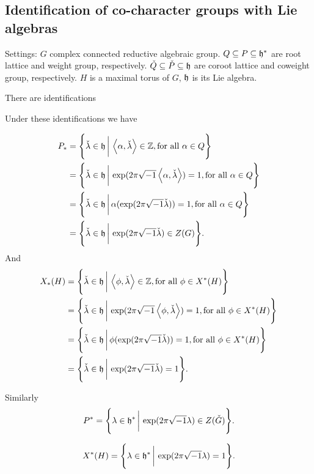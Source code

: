 
\label{1}

\subsection{Identification of co-character groups with Lie algebras}
Settings: $G$ complex connected reductive algebraic group. $Q \subseteq P \subseteq \mathfrak{h}^*$ are root lattice and weight group, respectively. $\check{Q} \subseteq \check{P} \subseteq \mathfrak{h}$ are coroot lattice and coweight group, respectively. $H$ is a maximal torus of $G$, $\mathfrak{h}$ is its Lie algebra.


There are identifications 




Under these identifications we have

\begin{align*}
  P_* &= \Biggl\{\check{\lambda} \in \mathfrak{h}\,\bigg\lvert\,\left\langle\alpha,\check{\lambda}\right\rangle \in \mathbb{Z}, \textrm{for all $\alpha \in Q$}\Biggr\}\\
  & = \Biggl\{\check{\lambda} \in \mathfrak{h}\,\bigg\lvert\,\exp(2\pi\sqrt{-1}\left\langle\alpha,\check{\lambda}\right\rangle) = 1, \textrm{for all $\alpha \in Q$}\Biggr\}\\
  & = \Biggl\{\check{\lambda} \in \mathfrak{h}\,\bigg\lvert\,\alpha(\exp(2\pi\sqrt{-1}\check{\lambda})) = 1, \textrm{for all $\alpha \in Q$}\Biggr\}\\
  & = \Biggl\{\check{\lambda} \in \mathfrak{h}\,\bigg\lvert\,\exp(2\pi\sqrt{-1}\check{\lambda}) \in Z(G)\Biggr\}.
\end{align*}
And
\begin{align*}
  X_{*}(H) & = \Biggl\{\check{\lambda} \in \mathfrak{h}\,\bigg\lvert\,\left\langle\phi,\check{\lambda}\right\rangle \in \mathbb{Z}, \textrm{for all $\phi \in X^*(H)$}\Biggr\}\\
  & = \Biggl\{\check{\lambda} \in \mathfrak{h}\,\bigg\lvert\,\exp(2\pi\sqrt{-1}\left\langle\phi,\check{\lambda}\right\rangle) = 1, \textrm{for all $\phi \in X^*(H)$}\Biggr\}\\
  & = \Biggl\{\check{\lambda} \in \mathfrak{h}\,\bigg\lvert\,\phi(\exp(2\pi\sqrt{-1}\check{\lambda})) = 1, \textrm{for all $\phi \in X^*(H)$}\Biggr\}\\
  & = \Biggl\{\check{\lambda} \in \mathfrak{h}\,\bigg\lvert\,\exp(2\pi\sqrt{-1}\check{\lambda}) = 1\Biggr\}.
\end{align*} 

Similarly
\[P^* = \Biggl\{\lambda \in \mathfrak{h}^*\,\bigg\lvert\,\exp(2 \pi \sqrt{-1} \lambda) \in Z(\check{G})\Biggr\}. \]

\[X^*(H) = \Biggl\{\lambda \in \mathfrak{h}^*\,\bigg\lvert\,\exp(2 \pi \sqrt{-1} \lambda ) = 1\Biggr\}.\]



